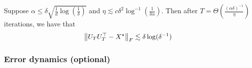 \begin{theorem}
Suppose $\alpha \le \delta \sqrt{\frac 1 d \log(\frac 1 {\delta})}$ and $\eta \lesssim c \delta^2 \log^{-1} (\frac 1 {\delta \alpha})$.
Then after $T = \Theta(\frac {(\alpha \delta)^{-1}} {\eta})$ iterations, we have that
\begin{align}
    \left\| U_T U_T^{\top} - X^{\star} \right\|_{F} \lesssim \delta \log(\delta^{-1})
\end{align}
\end{theorem}

\subsubsection{Error dynamics (optional)}

